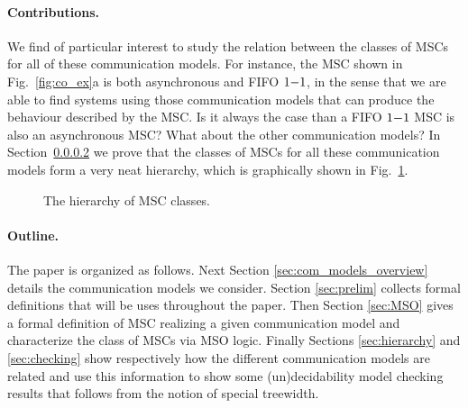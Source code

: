 \paragraph{Contributions.}

We find of particular interest to study the relation between the classes of MSCs for all of these communication models. For instance, the MSC shown in Fig.~\ref{fig:co_ex}a is both asynchronous and FIFO $1\mathsf{-}1$, in the sense that we are able to find systems using those communication models that can produce the behaviour described by the MSC. Is it always the case than a FIFO $1\mathsf{-}1$ MSC is also an asynchronous MSC? What about the other communication models? In Section~\ref{} we prove that the classes of MSCs for all these communication models form a very neat hierarchy, which is graphically shown in Fig.~\ref{fig:msc_hierarchy_full}.


\begin{figure}[h]
	\centering
	\caption{The hierarchy of MSC classes.}
	\label{fig:msc_hierarchy_full}
\end{figure}



\paragraph{Outline.} The paper is organized as follows. Next Section \ref{sec:com_models_overview} details the communication models we consider. Section \ref{sec:prelim} collects formal definitions that will be uses throughout the paper. Then Section \ref{sec:MSO} gives a formal definition of MSC realizing a given communication model and characterize the class of MSCs via MSO logic. Finally Sections \ref{sec:hierarchy} and \ref{sec:checking} show respectively how the different communication models are related and use this information to show some (un)decidability model checking results that follows from the notion of special treewidth.

